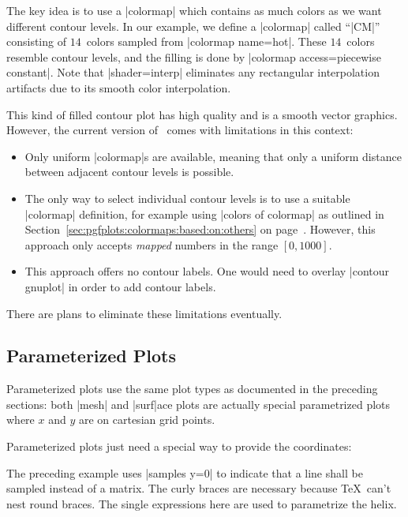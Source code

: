 {{The key idea is to use a |colormap| which contains as much colors as we want different contour levels. In our example, we define a |colormap| called ``|CM|'' consisting of $14$~colors sampled from |colormap name=hot|. These $14$~colors resemble contour levels, and the filling is done by |colormap access=piecewise constant|. Note that |shader=interp| eliminates any rectangular interpolation artifacts due to its smooth color interpolation.

This kind of filled contour plot has high quality and is a smooth vector graphics. However, the current version of \PGFPlots\ comes with limitations in this context:
\begin{itemize}
	\item Only uniform |colormap|s are available, meaning that only a uniform distance between adjacent contour levels is possible.
	\item The only way to select individual contour levels is to use a suitable |colormap| definition, for example using |colors of colormap| as outlined in Section~\ref{sec:pgfplots:colormaps:based:on:others} on page~\pageref{sec:pgfplots:colormaps:based:on:others}. However, this approach only accepts \emph{mapped} numbers in the range $[0,1000]$.
	\item This approach offers no contour labels. One would need to overlay |contour gnuplot| in order to add contour labels.
\end{itemize}
There are plans to eliminate these limitations eventually.

}%



\subsection{Parameterized Plots}
{%
%
Parameterized plots use the same plot types as documented in the preceding sections: both |mesh| and |surf|ace plots are actually special parametrized plots where $x$ and $y$ are on cartesian grid points.

Parameterized plots just need a special way to provide the coordinates:

\pgfplotsexpensiveexample
\begin{codeexample}[]
\end{codeexample}
\noindent The preceding example uses |samples y=0| to indicate that a line shall be sampled instead of a matrix. The curly braces are necessary because \TeX\ can't nest round braces. The single expressions here are used to parametrize the helix.

}}
